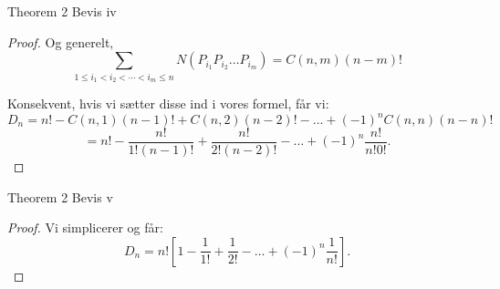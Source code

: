 \documentclass{beamer}
\begin{document}
\begin{frame}{Theorem 2 Bevis iv}
   \begin{proof}
       Og generelt, 
       $$\sum_{1 \leq i_1 < i_2 < \cdots < i_m \leq n} N(P_{i_1}P_{i_2} \ldots P_{i_m}) = C(n,m)(n-m)!$$

       Konsekvent, hvis vi sætter disse ind i vores formel, får vi: 
       $$D_n = n! - C(n, 1)(n - 1)! + C(n, 2)(n - 2)! - \dots + (-1)^n C(n, n)(n - n)!$$
       $$= n! - \frac{n!}{1!(n - 1)!} + \frac{n!}{2!(n - 2)!} - \dots + (-1)^n \frac{n!}{n!0!}.$$
   \end{proof} 
\end{frame}

\begin{frame}{Theorem 2 Bevis v}
   \begin{proof}
   Vi simplicerer og får:
       $$D_n = n! \left[ 1 - \frac{1}{1!} + \frac{1}{2!} - \dots + (-1)^n \frac{1}{n!} \right].$$
   \end{proof} 
\end{frame}
\end{document}
